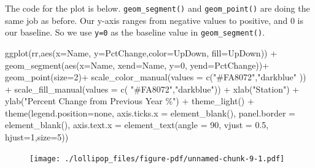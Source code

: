 \documentclass[
  letterpaper,
  DIV=11,
  numbers=noendperiod]{scrreprt}
\newenvironment{Shaded}{\begin{snugshade}}{\end{snugshade}}
\newcommand{\AttributeTok}[1]{\textcolor[rgb]{0.40,0.45,0.13}{#1}}
\newcommand{\DecValTok}[1]{\textcolor[rgb]{0.68,0.00,0.00}{#1}}
\newcommand{\FloatTok}[1]{\textcolor[rgb]{0.68,0.00,0.00}{#1}}
\newcommand{\FunctionTok}[1]{\textcolor[rgb]{0.28,0.35,0.67}{#1}}
\newcommand{\NormalTok}[1]{\textcolor[rgb]{0.00,0.23,0.31}{#1}}
\newcommand{\SpecialCharTok}[1]{\textcolor[rgb]{0.37,0.37,0.37}{#1}}
\newcommand{\StringTok}[1]{\textcolor[rgb]{0.13,0.47,0.30}{#1}}
\begin{document}
The code for the plot is below. \texttt{geom\_segment()} and
\texttt{geom\_point()} are doing the same job as before. Our y-axis
ranges from negative values to positive, and 0 is our baseline. So we
use \texttt{y=0} as the baseline value in \texttt{geom\_segment()}.

\begin{Shaded}
\begin{Highlighting}[]
\FunctionTok{ggplot}\NormalTok{(rr,}\FunctionTok{aes}\NormalTok{(}\AttributeTok{x=}\NormalTok{Name, }\AttributeTok{y=}\NormalTok{PctChange,}\AttributeTok{color=}\NormalTok{UpDown, }\AttributeTok{fill=}\NormalTok{UpDown)) }\SpecialCharTok{+}
  \FunctionTok{geom\_segment}\NormalTok{(}\FunctionTok{aes}\NormalTok{(}\AttributeTok{x=}\NormalTok{Name, }\AttributeTok{xend=}\NormalTok{Name, }\AttributeTok{y=}\DecValTok{0}\NormalTok{, }\AttributeTok{yend=}\NormalTok{PctChange))}\SpecialCharTok{+}
  \FunctionTok{geom\_point}\NormalTok{(}\AttributeTok{size=}\DecValTok{2}\NormalTok{)}\SpecialCharTok{+}
  \FunctionTok{scale\_color\_manual}\NormalTok{(}\AttributeTok{values =} \FunctionTok{c}\NormalTok{(}\StringTok{"\#FA8072"}\NormalTok{,}\StringTok{"darkblue"}\NormalTok{ )) }\SpecialCharTok{+}
  \FunctionTok{scale\_fill\_manual}\NormalTok{(}\AttributeTok{values =} \FunctionTok{c}\NormalTok{( }\StringTok{"\#FA8072"}\NormalTok{,}\StringTok{"darkblue"}\NormalTok{))  }\SpecialCharTok{+}
  \FunctionTok{xlab}\NormalTok{(}\StringTok{"Station"}\NormalTok{) }\SpecialCharTok{+}
  \FunctionTok{ylab}\NormalTok{(}\StringTok{"Percent Change from Previous Year \%"}\NormalTok{) }\SpecialCharTok{+}
  \FunctionTok{theme\_light}\NormalTok{() }\SpecialCharTok{+}
  \FunctionTok{theme}\NormalTok{(}\AttributeTok{legend.position=}\StringTok{\textquotesingle{}none\textquotesingle{}}\NormalTok{,}
        \AttributeTok{axis.ticks.x =} \FunctionTok{element\_blank}\NormalTok{(),}
        \AttributeTok{panel.border =} \FunctionTok{element\_blank}\NormalTok{(),}
        \AttributeTok{axis.text.x =} \FunctionTok{element\_text}\NormalTok{(}\AttributeTok{angle =} \DecValTok{90}\NormalTok{, }\AttributeTok{vjust =} \FloatTok{0.5}\NormalTok{, }\AttributeTok{hjust=}\DecValTok{1}\NormalTok{,}\AttributeTok{size=}\DecValTok{5}\NormalTok{)) }
\end{Highlighting}
\end{Shaded}

\begin{figure}[H]

{\centering \texttt{[image: ./lollipop\_files/figure-pdf/unnamed-chunk-9-1.pdf]}

}

\end{figure}
\end{document}
